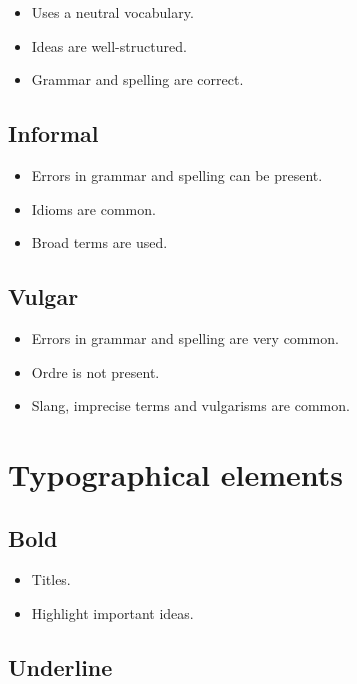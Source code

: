 \documentclass{article}
\begin{document}
\begin{itemize}
    \item Uses a neutral vocabulary.
    \item Ideas are well-structured.
    \item Grammar and spelling are correct.
\end{itemize}

\subsection*{Informal}

\begin{itemize}
    \item Errors in grammar and spelling can be present.
    \item Idioms are common.
    \item Broad terms are used.
\end{itemize}

\subsection*{Vulgar}

\begin{itemize}
    \item Errors in grammar and spelling are very common.
    \item Ordre is not present.
    \item Slang, imprecise terms and vulgarisms are common.
\end{itemize}

\section*{Typographical elements}

\subsection*{Bold}

\begin{itemize}
    \item Titles.
    \item Highlight important ideas.
\end{itemize}

\subsection*{Underline}
\end{document}
